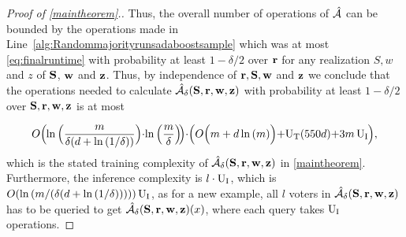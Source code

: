 \begin{proof}[Proof of \cref{maintheorem}.]
Thus, the overall number of operations of $\mathcal{\hat{A}}$ can be bounded by the operations made in Line~\ref{alg:Randommajorityrunsadaboostsample} which was at most \cref{eq:finalruntime} with probability at least $1-\delta/2$ over $\mathbf{r}$ for any realization $S,w$ and $ z $  of $\mathbf{S}$, $ \mathbf{w} $ and $ \mathbf{z} $. Thus, by independence of $\mathbf{r},\mathbf{S},\mathbf{w}$ and $\mathbf{z}$ we conclude that the operations needed to calculate $ \mathcal{\hat{A}}_{\delta}(\mathbf{S},\mathbf{r},\mathbf{w},\mathbf{z}) $ with probability at least $ 1-\delta/2$ over $ \mathbf{S},\mathbf{r},\mathbf{w},\mathbf{z} $  is at most

\begin{align*}
  O\Big(\negmedspace\ln{\Big(\frac{m}{\delta\small(d+\ln{\left(1/\delta \right)}\small)} \Big)}\negmedspace\cdot\negmedspace  \ln{\Big(\frac{m}{\delta} \Big)} \negmedspace\Big)\negmedspace\cdot \negmedspace\Big(O\Big(m+d\ln{\left(m \right)}\Big)\negmedspace+\negmedspace\Utrain(550d)\negmedspace+\negmedspace 3m\Uinf\negmedspace\Big),
\end{align*}
which is the stated training complexity of $\mathcal{\hat{A}}_{\delta}(\mathbf{S},\mathbf{r},\mathbf{w},\mathbf{z})$ in \cref{maintheorem}. Furthermore, the inference complexity is $ l\cdot\operatorname{U_{I}} $, which is $ O(\ln{(m/(\delta(d+\ln{(1/\delta )})) )})\operatorname{U_{I}} $, as for a new example, all $ l $ voters in $ \mathcal{\hat{A}}_{\delta}(\mathbf{S},\mathbf{r},\mathbf{w},\mathbf{z}) $ has to be queried to get $ \mathcal{\hat{A}}_{\delta}(\mathbf{S},\mathbf{r},\mathbf{w},\mathbf{z})(x) $, where each query takes $ \operatorname{U_{I}} $ operations.     
\end{proof}

